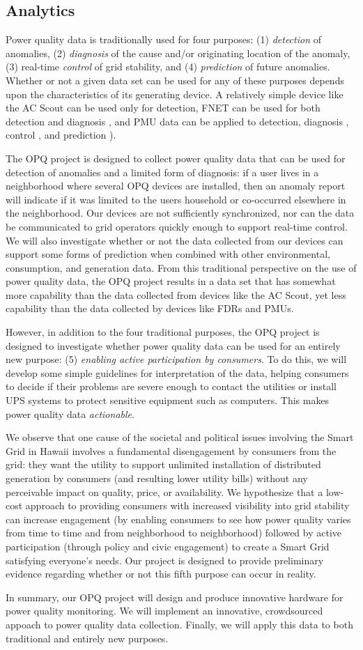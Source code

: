 \subsection{Analytics}

Power quality data is traditionally used for four purposes: (1) {\em detection} of anomalies, (2) {\em diagnosis} of the cause and/or originating location of the anomaly, (3) real-time {\em control} of grid stability, and (4) {\em prediction} of future anomalies. Whether or not a given data set can be used for any of these purposes depends upon the characteristics of its generating device. A relatively simple device like the AC Scout can be used only for detection, FNET can be used for both detection and diagnosis \cite{Markham2012}, and PMU data can be applied to detection, diagnosis \cite{Zhao2009}, control \cite{Liu2010}, and prediction \cite{Liu2009,Gao2012}). 

The OPQ project is designed to collect power quality data that can be used for detection of anomalies and a limited form of diagnosis: if a user lives in a neighborhood where several OPQ devices are installed, then an anomaly report will indicate if it was limited to the users household or co-occurred elsewhere in the neighborhood. Our devices are not sufficiently synchronized, nor can the data be communicated to grid operators quickly enough to support real-time control. We will also investigate whether or not the data collected from our devices can support some forms of prediction when combined with other environmental, consumption, and generation data. From this traditional perspective on the use of power quality data, the OPQ project results in a data set that has somewhat more capability than the data collected from devices like the AC Scout, yet less capability than the data collected by devices like FDRs and PMUs. 

However, in addition to the four traditional purposes, the OPQ project is designed to investigate whether power quality data can be used for an entirely new purpose: (5) {\em enabling active participation by consumers}. To do this, we will develop some simple guidelines for interpretation of the data, helping consumers to decide if their problems are severe enough to contact the utilities or install UPS systems to protect sensitive equipment such as computers.  This makes power quality data {\em actionable}.

We observe that one cause of the societal and political issues involving the Smart Grid in Hawaii involves a fundamental disengagement by consumers from the grid: they want the utility to support unlimited installation of distributed generation by consumers (and resulting lower utility bills) without any perceivable impact on quality, price, or availability.  We hypothesize that a low-cost approach to providing consumers with increased visibility into grid stability can increase engagement (by enabling consumers to see how power quality varies from time to time and from neighborhood to neighborhood) followed by active participation (through policy and civic engagement) to create a Smart Grid satisfying everyone's needs.  Our project is designed to provide preliminary evidence regarding whether or not this fifth purpose can occur in reality.

In summary, our OPQ project will design and produce innovative hardware for power quality monitoring. We will implement an innovative, crowdsourced appoach to power quality data collection. Finally, we will apply this data to both traditional and entirely new purposes.   